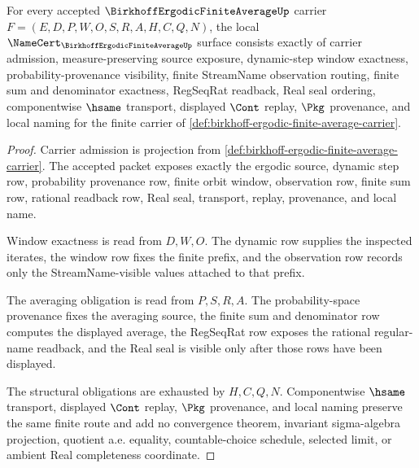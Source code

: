 \begin{theorem}
\label{thm:birkhoff-ergodic-finite-average-namecert-obligations}
For every accepted $\BirkhoffErgodicFiniteAverageUp$ carrier $F=(E,D,P,W,O,S,R,A,H,C,Q,N)$, the local $\NameCert_{\BirkhoffErgodicFiniteAverageUp}$ surface consists exactly of carrier admission, measure-preserving source exposure, dynamic-step window exactness, probability-provenance visibility, finite StreamName observation routing, finite sum and denominator exactness, RegSeqRat readback, Real seal ordering, componentwise $\hsame$ transport, displayed $\Cont$ replay, $\Pkg$ provenance, and local naming for the finite carrier of \autoref{def:birkhoff-ergodic-finite-average-carrier}.
\end{theorem}
\begin{proof}
Carrier admission is projection from \autoref{def:birkhoff-ergodic-finite-average-carrier}. The accepted packet exposes exactly the ergodic source, dynamic step row, probability provenance row, finite orbit window, observation row, finite sum row, rational readback row, Real seal, transport, replay, provenance, and local name.

Window exactness is read from $D,W,O$. The dynamic row supplies the inspected iterates, the window row fixes the finite prefix, and the observation row records only the StreamName-visible values attached to that prefix.

The averaging obligation is read from $P,S,R,A$. The probability-space provenance fixes the averaging source, the finite sum and denominator row computes the displayed average, the RegSeqRat row exposes the rational regular-name readback, and the Real seal is visible only after those rows have been displayed.

The structural obligations are exhausted by $H,C,Q,N$. Componentwise $\hsame$ transport, displayed $\Cont$ replay, $\Pkg$ provenance, and local naming preserve the same finite route and add no convergence theorem, invariant sigma-algebra projection, quotient a.e. equality, countable-choice schedule, selected limit, or ambient Real completeness coordinate.
\end{proof}

